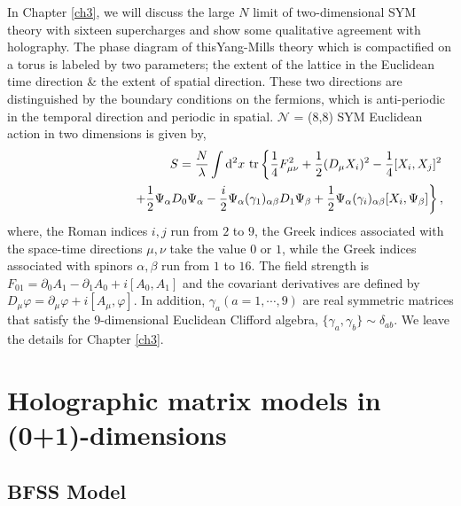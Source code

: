 In Chapter \ref{ch3}, we will discuss the large $N$ limit of two-dimensional SYM theory with sixteen supercharges
and show some qualitative agreement with holography. 
The phase diagram of thisYang-Mills theory which is compactified on a torus is labeled by two parameters; 
the extent of the lattice in the Euclidean time direction \& the extent of spatial direction. These two 
directions are distinguished by the boundary conditions on the fermions, which is anti-periodic in the
temporal direction and periodic in spatial. 
$\mathcal{N}$ = (8,8) SYM Euclidean action in two dimensions is given by, 
\begin{eqnarray}
&& 
       S=\frac{N}{\lambda}\int{}{\rm d}^2x\ {\rm tr} 
             \left\{ \frac{1}{4}F^2_{\mu\nu} 
                    + \frac{1}{2}(D_\mu X_i)^2 - \frac{1}{4}[X_i,X_j]^2  
             \right.  \nonumber \\
&& 
      \hspace{3cm} \left.
          +\frac{1}{2} \Psi_\alpha  D_0 \Psi_\alpha 
          -\frac{i}{2} \Psi_\alpha (\gamma_{1})_{\alpha \beta} D_1 \Psi_\beta 
        + \frac{1}{2}\Psi_\alpha (\gamma_i)_{\alpha \beta} [X_i, \Psi_\beta] \right\},
        \label{cont_action}
\end{eqnarray}
where, the Roman indices $i,j$ run from $2$ to $9$, 
the Greek indices associated with the space-time directions $\mu,\nu$ take the value $0$ or $1$,
while the Greek indices associated with spinors $\alpha, \beta$ run from $1$ to $16$. 
The field strength is $F_{01} = \partial_0 A_1 - \partial_1 A_0 +i[A_0,A_1]$ and the covariant derivatives are 
defined by $D_\mu \varphi = \partial_\mu \varphi + i[A_\mu, \varphi]$.  
In addition, $\gamma_a(a=1,\cdots,9)$ are real symmetric matrices that satisfy the 9-dimensional Euclidean Clifford algebra,
$\{\gamma_a,\gamma_b\} \sim \delta_{ab}$. We leave the details for Chapter \ref{ch3}. 

\section{Holographic matrix models in (0+1)-dimensions} 
  
\subsection{BFSS Model}

